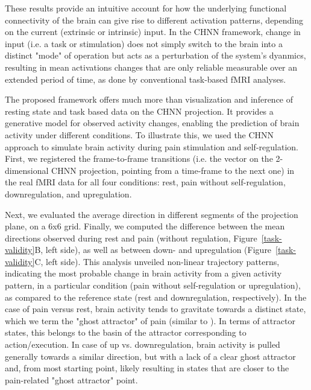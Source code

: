 \documentclass{article}
\begin{document}
These results provide an intuitive account for how the underlying functional connectivity of the brain can give rise to
different activation patterns, depending on the current (extrinsic or intrinsic) input. In the CHNN framework, change in
input (i.e. a task or stimulation) does not simply switch to the brain into a distinct "mode" of operation but acts as
a perturbation of the system's dyanmics, resulting in mean activations changes that are only reliable measurable over
an extended period of time, as done by conventional task-based fMRI analyses.

The proposed framework offers much more than visualization and inference of resting state and task based data on the
CHNN projection. It provides a generative model for observed activity changes, enabling the prediction of brain
activity under different conditions. To illustrate this, we used the CHNN approach to simulate brain activity during pain
stimulation and self-regulation. First, we registered the frame-to-frame transitions (i.e. the vector on the 2-dimensional CHNN projection, pointing from a time-frame to the next one) in the real fMRI data for all four
conditions: rest, pain without self-regulation, downregulation, and upregulation.

Next, we evaluated the average direction in different segments of the projection plane, on a 6x6 grid. Finally, we
computed the difference between the mean directions observed during rest and pain (without regulation,
Figure~\ref{task-validity}B, left side), as well as between down- and upregulation (Figure~\ref{task-validity}C, left side).
This analysis unveiled non-linear trajectory patterns, indicating the most probable change in brain activity from a
given activity pattern, in a particular condition (pain without self-regulation or upregulation), as
compared to the reference state (rest and downregulation, respectively). In the case of pain versus rest, brain
activity tends to gravitate towards a distinct state, which we term the "ghost attractor" of pain (similar to \cite{vohryzek2020ghost}). In terms of attractor states, this belongs to the basin of the
attractor corresponding to action/execution. In case of up vs. downregulation, brain activity is pulled generally
towards a similar direction, but with a lack of a clear ghost attractor and, from most starting point, likely resulting in states that are closer to the pain-related "ghost attractor" point.
\end{document}
